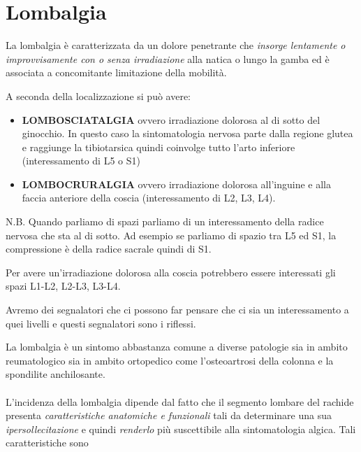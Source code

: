 

\section{Lombalgia}


La lombalgia è caratterizzata da un dolore penetrante che \emph{insorge
lentamente o improvvisamente con o senza irradiazione} alla natica o
lungo la gamba ed è associata a concomitante limitazione della mobilità.

A seconda della localizzazione si può avere:

\begin{itemize}
\item

  \textbf{LOMBOSCIATALGIA} ovvero irradiazione dolorosa al di sotto del
  ginocchio. In questo caso la sintomatologia nervosa parte dalla
  regione glutea e raggiunge la tibiotarsica quindi coinvolge tutto
  l'arto inferiore (interessamento di L5 o S1)

\item
   
  \textbf{LOMBOCRURALGIA} ovvero irradiazione dolorosa all'inguine e
  alla faccia anteriore della coscia (interessamento di L2, L3, L4).
   
\end{itemize}

N.B. Quando parliamo di spazi parliamo di un interessamento della radice
nervosa che sta al di sotto. Ad esempio se parliamo di spazio tra L5 ed
S1, la compressione è della radice sacrale quindi di S1.

Per avere un'irradiazione dolorosa alla coscia potrebbero essere
interessati gli spazi L1-L2, L2-L3, L3-L4.

Avremo dei segnalatori che ci possono far pensare che ci sia un
interessamento a quei livelli e questi segnalatori sono i riflessi.

La lombalgia è un sintomo abbastanza comune a diverse patologie sia in
ambito reumatologico sia in ambito ortopedico come l'osteoartrosi della
colonna e la spondilite anchilosante.
\\\\
L'incidenza della lombalgia dipende dal fatto che il segmento lombare
del rachide presenta \emph{caratteristiche anatomiche e funzionali} tali
da determinare una sua \emph{ipersollecitazione} e quindi
\emph{renderlo} più suscettibile alla sintomatologia algica. Tali
caratteristiche sono

